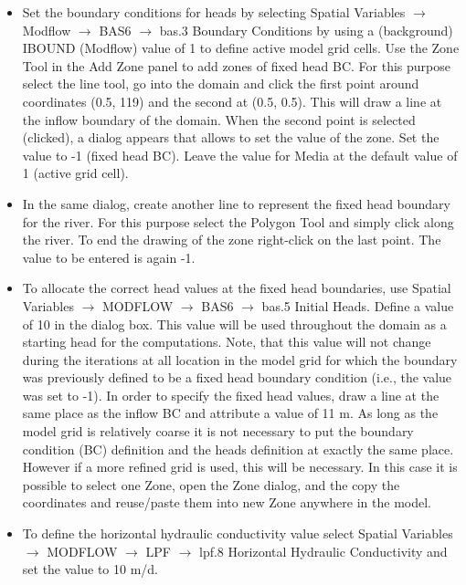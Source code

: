 \begin{itemize}
\item Set the boundary conditions for heads by 
selecting {\color{blue}Spatial Variables} $\rightarrow$ {\color{blue}Modflow} $\rightarrow$ 
{\color{blue}BAS6} $\rightarrow$ {\color{blue}bas.3 Boundary Conditions} by using a (background)
IBOUND (Modflow) value of 1 to define active model grid cells. 
Use the {\color{blue}Zone Tool} in the {\color{blue}Add Zone} panel to add zones 
of fixed head BC. For this purpose select the line tool, go into the domain and click
the first point around coordinates (0.5, 119) and the second at (0.5, 0.5). 
This will draw a line at the inflow boundary of the domain.
When the second point is selected (clicked), a dialog appears that allows to set the 
value of the zone. Set the value to -1 (fixed head BC). 
Leave the value for {\color{blue}Media} at the default value of 1 (active grid cell).

\item In the same dialog, create another line to represent the fixed head boundary for the river. 
For this purpose select the {\color{blue}Polygon Tool} 
and simply click along the river. 
To end the drawing of the zone right-click on the last point. 
The value to be entered is again -1.

\item To allocate the correct head values at the fixed head boundaries, 
use {\color{blue}Spatial Variables} $\rightarrow$ {\color{blue}MODFLOW} $\rightarrow$ 
{\color{blue}BAS6}
$\rightarrow$ {\color{blue}bas.5 Initial Heads}. 
Define a value of 10 in the dialog box.
This value will be used throughout the domain as a starting head for the computations.
Note, that this value will not change during the iterations at all location in the model grid for which 
the boundary was previously defined to be a fixed head boundary condition (i.e., the value was set to -1).
In order to specify the fixed head values, draw a line at the same place as the inflow BC 
and attribute a value of 11 m. As long as the model grid is relatively 
coarse it is not necessary to put the boundary condition (BC) definition
and the heads definition at exactly the same place. 
However if a more refined grid is used, this will be necessary. 
In this case it is possible to select one {\color{blue}Zone}, open the {\color{blue}Zone} dialog, 
and the copy the coordinates and reuse/paste them into new {\color{blue}Zone} 
anywhere in the model.

\item To define the horizontal hydraulic conductivity value 
select {\color{blue}Spatial Variables} 
$\rightarrow$ {\color{blue}MODFLOW} $\rightarrow$ {\color{blue}LPF} $\rightarrow$ 
{\color{blue}lpf.8 Horizontal Hydraulic Conductivity} and set the value to 10 m/d.


\end{itemize}
